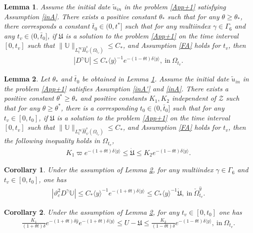\documentclass[10pt,a4paper]{amsart}
\newtheorem{lemma}{Lemma}
\newtheorem{corollary}{Corollary}
\newcommand\y{{{\langle y \rangle}}}
\begin{document}
\begin{lemma}\label{DI}
Assume the initial date $\tilde{u}_{in}$ in the problem \eqref{App+1} satisfying Assumption \ref{inA}.
There exists a positive constant $\theta_{*}$ such that for any $\theta\geq\theta_{*}$, there corresponds a constant $\bar{t}_{0}\in(0,t^{*}]$ such that for any multiindex $\gamma\in\Gamma_{6}$ and any $t_{v}\in(0,\bar{t}_{0}]$,
if $\mathfrak{U}$ is a solution to the problem \eqref{App+1} on the time interval $[0,t_{v}]$ such that
$\|\mathbb{U}\|_{L_{t}^{\infty}\hat{H}_{\psi}^{s}(\Omega_{t_{v}})}\leq C_{*}$,
and Assumption \ref{FA} holds for $t_{v}$, then
\begin{align}\label{Di}
|D^{\gamma}\mathbb{U}|\leq C_{*}\y^{-1}e^{-(1-\theta t)\delta\y}, ~\text{in}~\Omega_{t_{v}}.
\end{align}
\end{lemma}

\begin{lemma}\label{wdotu}
Let $\theta_{*}$ and $\bar{t}_{0}$ be obtained in Lemma \ref{DI}.
Assume the initial date $\tilde{u}_{in}$ in the problem \eqref{App+1} satisfies Assumption \ref{inA'} and \ref{inA}.
There exists a positive constant $\theta^{*}\geq \theta_{*}$ and positive constants $K_{1},K_{2}$ independent of $\mathcal{Z}$ such that for any $\theta\geq\theta^{*}$, there is a corresponding $t_{0}\in(0,\bar{t}_{0}]$ such that for any $t_{v}\in[0,t_{0}]$, if $\mathfrak{U}$ is a solution to the problem \eqref{App+1} on the time interval $[0,t_{v}]$ such that
$\|\mathbb{U}\|_{L_{t}^{\infty}\hat{H}_{\psi}^{s}(\Omega_{t_{v}})}\leq C_{*}$,
and Assumption \ref{FA} holds for $t_{v}$, then the following inequality holds in $\Omega_{t_{v}}$,
\begin{align}\label{dotu}
K_{1}\varpi e^{-(1+\theta t)\delta\y}\leq \dot{\mathfrak{U}}\leq K_{2}e^{-(1-\theta t)\delta\y}.
\end{align}
\end{lemma}

\begin{corollary}\label{wdotuC'}
Under the assumption of Lemma \ref{wdotu}, for any multiindex $\gamma\in\Gamma_{6}$ and $t_{v}\in[0,t_{0}]$, one has
\begin{align*}
|\vartheta_{c}^{2}D^{\gamma}\mathbb{U}|
\leq C_{*}\y^{-1}e^{-(1+\theta t)\delta\y}
\leq C_{*}\y^{-1}\dot{\mathfrak{U}},~\text{in}~\check{\Omega}_{t_{v}}^{\hat{y}}.
\end{align*}
\end{corollary}

\begin{corollary}\label{wdotuC}
Under the assumption of Lemma \ref{wdotu}, for any $t_{v}\in[0,t_{0}]$ one has
\begin{align}\label{Umu}
\frac{K_{1}}{(1+\theta t)\delta}e^{-(1+\theta t)\delta\hat{y}}e^{-(1+\theta t)\delta\y}
\leq U-\mathfrak{U}
\leq \frac{K_{2}}{(1-\theta t)\delta}e^{-(1-\theta t)\delta\y}, ~\text{in}~\Omega_{t_{v}}.
\end{align}
\end{corollary}
\end{document}
